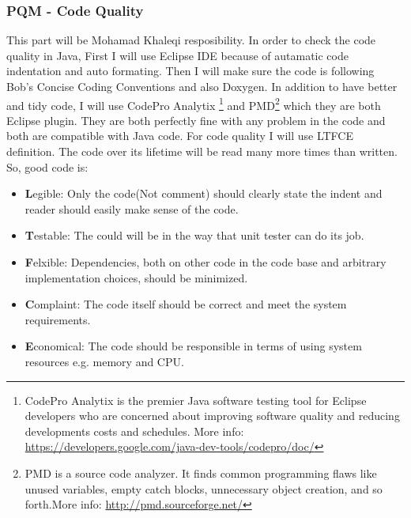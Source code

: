 \documentclass{article}
\begin{document}
\subsubsection{PQM - Code Quality}
This part will be Mohamad Khaleqi resposibility. In order to check the code quality in Java, First I will use Eclipse IDE because of autamatic code indentation and auto formating. Then I will make sure the code is following Bob's Concise Coding Conventions and also Doxygen. In addition to have better and tidy code, I will use CodePro Analytix \footnote{CodePro Analytix is the premier Java software testing tool for Eclipse developers who are concerned about improving software quality and reducing developments costs and schedules. More info: \url{https://developers.google.com/java-dev-tools/codepro/doc/}} and PMD\footnote{ PMD is a source code analyzer. It finds common programming flaws like unused variables, empty catch blocks, unnecessary object creation, and so forth.More info: \url{http://pmd.sourceforge.net/}} which they are both Eclipse plugin. They are both perfectly fine with any problem in the code and both are compatible with Java code. For code quality I will use LTFCE definition. The code over its lifetime will be read many more times than written. So, good code is: 
\begin{itemize}
 \item \textbf{L}egible: Only the code(Not comment) should clearly state the indent and reader should easily make sense of the code.
 \item \textbf{T}estable: The could will be in the way that unit tester can do its job.
 \item \textbf{F}elxible: Dependencies, both on other code in the code base and arbitrary implementation choices, should be minimized.
 \item \textbf{C}omplaint: The code itself should be correct and meet the system requirements.
 \item \textbf{E}conomical: The code should be responsible in terms of using system resources e.g. memory and CPU.
 
\end{itemize}
\end{document}
